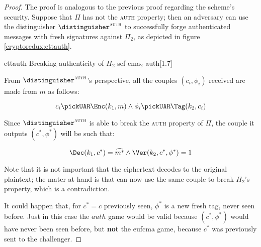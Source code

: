 \begin{proof}
    The proof is analogous to the previous proof regarding the scheme's \cpa{} security. Suppose that $\Pi$ has not the \textsc{auth} property; then an adversary can use the distinguisher $\distinguisher^{\textsc{auth}}$ to successfully forge authenticated messages with fresh signatures against $\Pi_2$, as depicted in figure \ref{cryptoredux:ettauth}.
    
    \begin{cryptoredux}
        {ettauth}
        {Breaking authenticity of $\Pi_2$}
        {sef-cma$_2$}
        {auth}[1.7]

        \cseqbeginloop


        \cseqendloop

        \cseqdelay



    \end{cryptoredux}

From $\distinguisher^{\textsc{auth}}$'s perspective, all the couples $(c_i, \phi_i)$ received are made from $m$ as follows:

\[
    c_i \pickUAR \Enc(k_1, m) \wedge \phi_i \pickUAR \Tag(k_2, c_i)
\]

Since $\distinguisher^{\textsc{auth}}$ is able to break the \textsc{auth} property of $\Pi$, the couple it outputs $(c^*, \phi^*)$ will be such that:

\[
    \Dec(k_1, c^*) = \widehat{m^*} \wedge \Ver(k_2, c^*, \phi^*) = 1
\]

Note that it is not important that the ciphertext decodes to the original plaintext; the mater at hand is that \adversary{} can now use the same couple to break $\Pi_2$'s \ufcma{} property, which is a contradiction.

It could happen that, for $c^* = c$ previously seen, $\phi^*$ is a new fresh tag, never seen before. Just in this case the $auth$ game would be valid because $(c^{*}, \phi^{*})$ would have never been seen before, but \textbf{not } the eufcma game, because $c^{*}$ was previously sent to the challenger.
\end{proof}
    
